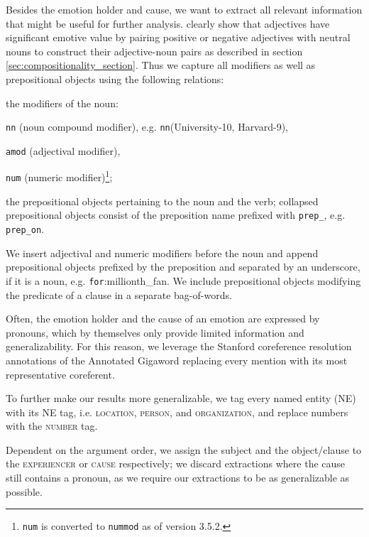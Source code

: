Besides the emotion holder and cause, we want to extract all relevant information that might be useful for further analysis. \citeauthor{adjective_noun_pairs} clearly show that adjectives have significant emotive value by pairing positive or negative adjectives with neutral nouns to construct their adjective-noun pairs as described in section \ref{sec:compositionality_section}. Thus we capture all modifiers as well as prepositional objects using the following relations:
\begin{aenumerate}
	\item the modifiers of the noun:
	\begin{aenumerate}
		\item \texttt{nn} (noun compound modifier), e.g. \texttt{nn}(University-10, Harvard-9),
		\item \texttt{amod} (adjectival modifier),
		\item \texttt{num} (numeric modifier)\footnote{\texttt{num} is converted to \texttt{nummod} as of version 3.5.2.};
	\end{aenumerate}
	\item the prepositional objects pertaining to the noun and the verb; collapsed prepositional objects consist of the preposition name prefixed with \texttt{prep\_}, e.g. \texttt{prep\_on}.
\end{aenumerate}

We insert adjectival and numeric modifiers before the noun and append prepositional objects prefixed by the preposition and separated by an underscore, if it is a noun, e.g. \texttt{for}:millionth\_fan. We include prepositional objects modifying the predicate of a clause in a separate bag-of-words.

Often, the emotion holder and the cause of an emotion are expressed by pronouns, which by themselves only provide limited information and generalizability. For this reason, we leverage the Stanford coreference resolution annotations of the Annotated Gigaword replacing every mention with its most representative coreferent.

To further make our results more generalizable, we tag every named entity (NE) with its NE tag, i.e. \textsc{location}, \textsc{person}, and \textsc{organization}, and replace numbers with the \textsc{number} tag.

Dependent on the argument order, we assign the subject and the object/clause to the \textsc{experiencer} or \textsc{cause} respectively; we discard extractions where the cause still contains a pronoun, as we require our extractions to be as generalizable as possible.

